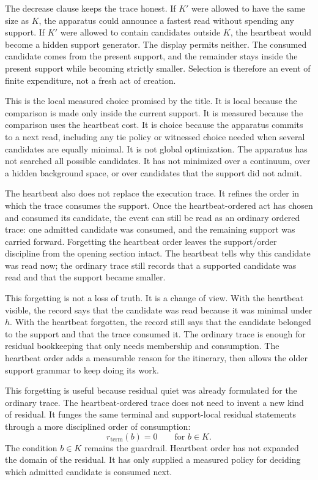The decrease clause keeps the trace honest. If \(K'\) were allowed to have the
same size as \(K\), the apparatus could announce a fastest read without
spending any support. If \(K'\) were allowed to contain candidates outside
\(K\), the heartbeat would become a hidden support generator. The display
permits neither. The consumed candidate comes from the present support, and
the remainder stays inside the present support while becoming strictly
smaller. Selection is therefore an event of finite expenditure, not a fresh
act of creation.

This is the local measured choice promised by the title. It is local because
the comparison is made only inside the current support. It is measured because
the comparison uses the heartbeat cost. It is choice because the apparatus
commits to a next read, including any tie policy or witnessed choice needed
when several candidates are equally minimal. It is not global optimization.
The apparatus has not searched all possible candidates. It has not minimized
over a continuum, over a hidden background space, or over candidates that the
support did not admit.

The heartbeat also does not replace the execution trace. It refines the order
in which the trace consumes the support. Once the heartbeat-ordered act has
chosen and consumed its candidate, the event can still be read as an ordinary
ordered trace: one admitted candidate was consumed, and the remaining support
was carried forward. Forgetting the heartbeat order leaves the support/order
discipline from the opening section intact. The heartbeat tells why this
candidate was read now; the ordinary trace still records that a supported
candidate was read and that the support became smaller.

This forgetting is not a loss of truth. It is a change of view. With the
heartbeat visible, the record says that the candidate was read because it was
minimal under \(h\). With the heartbeat forgotten, the record still says that
the candidate belonged to the support and that the trace consumed it. The
ordinary trace is enough for residual bookkeeping that only needs membership
and consumption. The heartbeat order adds a measurable reason for the
itinerary, then allows the older support grammar to keep doing its work.

This forgetting is useful because residual quiet was already formulated for
the ordinary trace. The heartbeat-ordered trace does not need to invent a new
kind of residual. It funges the same terminal and support-local residual statements through a more disciplined order of consumption:
\[
  r_{\mathrm{term}}(b)=0
  \qquad\text{for } b\in K .
\]
The condition \(b\in K\) remains the guardrail. Heartbeat order has not
expanded the domain of the residual. It has only supplied a measured policy
for deciding which admitted candidate is consumed next.

